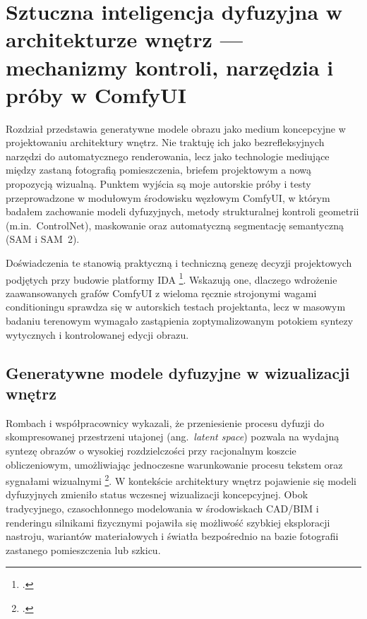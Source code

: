 \chapter{Sztuczna inteligencja dyfuzyjna w architekturze wnętrz --- mechanizmy kontroli, narzędzia i próby w ComfyUI}
\label{ch04:top}

Rozdział przedstawia generatywne modele obrazu jako medium koncepcyjne w projektowaniu architektury wnętrz. Nie traktuję ich jako bezrefleksyjnych narzędzi do automatycznego renderowania, lecz jako technologie mediujące między zastaną fotografią pomieszczenia, briefem projektowym a nową propozycją wizualną.
Punktem wyjścia są moje autorskie próby i testy przeprowadzone w modułowym środowisku węzłowym ComfyUI, w którym badałem zachowanie modeli dyfuzyjnych, metody strukturalnej kontroli geometrii (m.in.\ ControlNet), maskowanie oraz automatyczną segmentację semantyczną (SAM i SAM~2). 

Doświadczenia te stanowią praktyczną i techniczną genezę decyzji projektowych podjętych przy budowie platformy IDA \footcite{idaPlatform2026}. Wskazują one, dlaczego wdrożenie zaawansowanych grafów ComfyUI z wieloma ręcznie strojonymi wagami conditioningu sprawdza się w autorskich testach projektanta, lecz w masowym badaniu terenowym wymagało zastąpienia zoptymalizowanym potokiem syntezy wytycznych i kontrolowanej edycji obrazu.

\section{Generatywne modele dyfuzyjne w wizualizacji wnętrz}
\label{ch04:sec:genai-medium}

Rombach i współpracownicy wykazali, że przeniesienie procesu dyfuzji do skompresowanej przestrzeni utajonej (ang.\ \emph{latent space}) pozwala na wydajną syntezę obrazów o wysokiej rozdzielczości przy racjonalnym koszcie obliczeniowym, umożliwiając jednoczesne warunkowanie procesu tekstem oraz sygnałami wizualnymi \footcite{rombach2022ldm}.
W kontekście architektury wnętrz pojawienie się modeli dyfuzyjnych zmieniło status wczesnej wizualizacji koncepcyjnej. Obok tradycyjnego, czasochłonnego modelowania w środowiskach CAD/BIM i renderingu silnikami fizycznymi pojawiła się możliwość szybkiej eksploracji nastroju, wariantów materiałowych i światła bezpośrednio na bazie fotografii zastanego pomieszczenia lub szkicu.

